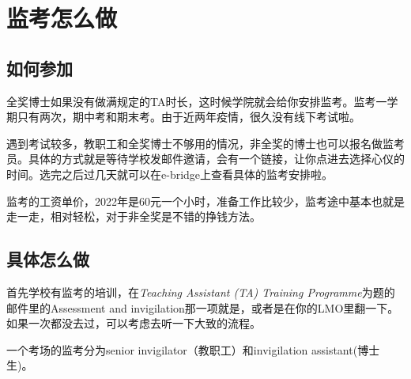 \section{监考怎么做}

\subsection{如何参加}
全奖博士如果没有做满规定的TA时长，这时候学院就会给你安排监考。监考一学期只有两次，期中考和期末考。由于近两年疫情，很久没有线下考试啦。

遇到考试较多，教职工和全奖博士不够用的情况，非全奖的博士也可以报名做监考员。具体的方式就是等待学校发邮件邀请，会有一个链接，让你点进去选择心仪的时间。选完之后过几天就可以在e-bridge上查看具体的监考安排啦。

监考的工资单价，2022年是60元一个小时，准备工作比较少，监考途中基本也就是走一走，相对轻松，对于非全奖是不错的挣钱方法。

\subsection{具体怎么做}
首先学校有监考的培训，在\textit{Teaching Assistant (TA) Training Programme}为题的邮件里的Assessment and invigilation那一项就是，或者是在你的LMO里翻一下。如果一次都没去过，可以考虑去听一下大致的流程。

一个考场的监考分为senior invigilator（教职工）和invigilation assistant(博士生)。

